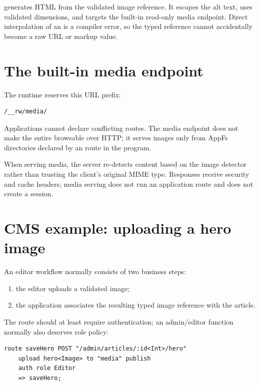  generates HTML from the validated image reference. It escapes the alt text, uses validated dimensions, and targets the built-in read-only media endpoint. Direct  interpolation of an  is a compiler error, so the typed reference cannot accidentally become a raw URL or markup value.

\section{The built-in media endpoint}

The runtime reserves this URL prefix:

\begin{lstlisting}
/__rw/media/
\end{lstlisting}

Applications cannot declare conflicting routes. The media endpoint does not make the entire  browsable over HTTP; it serves images only from AppFs directories declared by an  route in the program.

When serving media, the server re-detects content based on the image detector rather than trusting the client's original MIME type. Responses receive security and cache headers; media serving does not run an application route and does not create a session.

\section{CMS example: uploading a hero image}

An editor workflow normally consists of two business steps:

\begin{enumerate}
  \item the editor uploads a validated image;
  \item the application associates the resulting typed image reference with the article.
\end{enumerate}

The route should at least require authentication; an admin/editor function normally also deserves role policy:

\begin{lstlisting}[language=RWLang]
route saveHero POST "/admin/articles/:id<Int>/hero"
    upload hero<Image> to "media" publish
    auth role Editor
    => saveHero;
\end{lstlisting}

